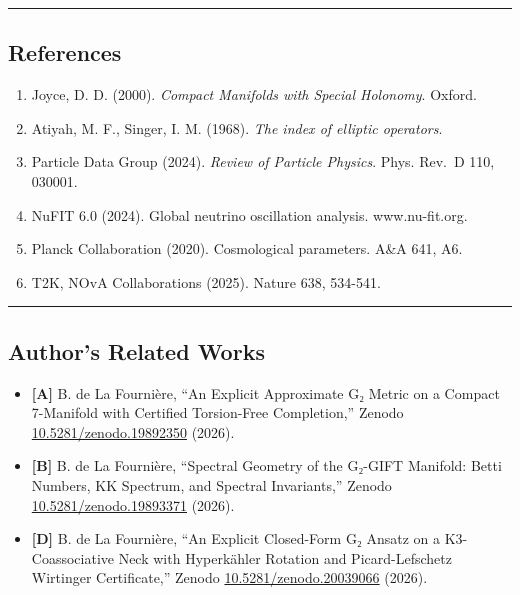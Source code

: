 \documentclass[11pt,a4paper]{article}
\begin{document}
\begin{center}\rule{0.5\linewidth}{0.5pt}\end{center}

\subsection{References}\label{references}

\begin{enumerate}

\item
  Joyce, D. D. (2000). \emph{Compact Manifolds with Special Holonomy}. Oxford.
\item
  Atiyah, M. F., Singer, I. M. (1968). \emph{The index of elliptic operators}.
\item
  Particle Data Group (2024). \emph{Review of Particle Physics}. Phys. Rev.~D 110, 030001.
\item
  NuFIT 6.0 (2024). Global neutrino oscillation analysis. www.nu-fit.org.
\item
  Planck Collaboration (2020). Cosmological parameters. A\&A 641, A6.
\item
  T2K, NOvA Collaborations (2025). Nature 638, 534-541.
\end{enumerate}

\begin{center}\rule{0.5\linewidth}{0.5pt}\end{center}

\subsection{Author's Related Works}\label{authors-related-works}

\begin{itemize}
\item
  \textbf{[A]} B. de La Fournière, ``An Explicit Approximate G₂ Metric on a Compact 7-Manifold with Certified Torsion-Free Completion,'' Zenodo \href{https://doi.org/10.5281/zenodo.19892350}{10.5281/zenodo.19892350} (2026).
\item
  \textbf{[B]} B. de La Fournière, ``Spectral Geometry of the G₂-GIFT Manifold: Betti Numbers, KK Spectrum, and Spectral Invariants,'' Zenodo \href{https://doi.org/10.5281/zenodo.19893371}{10.5281/zenodo.19893371} (2026).
\item
  \textbf{[D]} B. de La Fournière, ``An Explicit Closed-Form G₂ Ansatz on a K3-Coassociative Neck with Hyperkähler Rotation and Picard-Lefschetz Wirtinger Certificate,'' Zenodo \href{https://doi.org/10.5281/zenodo.20039066}{10.5281/zenodo.20039066} (2026).
\end{itemize}
\end{document}
